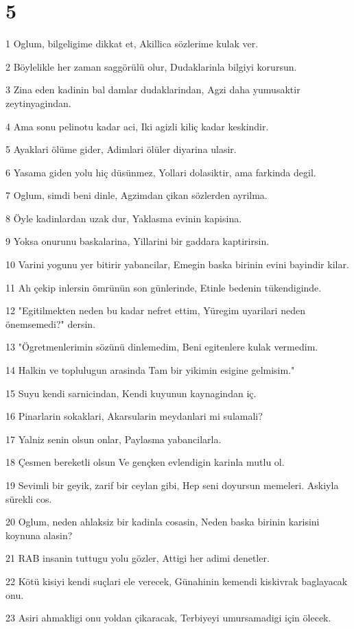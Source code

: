 \chapter{5}

\par 1 Oglum, bilgeligime dikkat et, Akillica sözlerime kulak ver.
\par 2 Böylelikle her zaman saggörülü olur, Dudaklarinla bilgiyi korursun.
\par 3 Zina eden kadinin bal damlar dudaklarindan, Agzi daha yumusaktir zeytinyagindan.
\par 4 Ama sonu pelinotu kadar aci, Iki agizli kiliç kadar keskindir.
\par 5 Ayaklari ölüme gider, Adimlari ölüler diyarina ulasir.
\par 6 Yasama giden yolu hiç düsünmez, Yollari dolasiktir, ama farkinda degil.
\par 7 Oglum, simdi beni dinle, Agzimdan çikan sözlerden ayrilma.
\par 8 Öyle kadinlardan uzak dur, Yaklasma evinin kapisina.
\par 9 Yoksa onurunu baskalarina, Yillarini bir gaddara kaptirirsin.
\par 10 Varini yogunu yer bitirir yabancilar, Emegin baska birinin evini bayindir kilar.
\par 11 Ah çekip inlersin ömrünün son günlerinde, Etinle bedenin tükendiginde.
\par 12 "Egitilmekten neden bu kadar nefret ettim, Yüregim uyarilari neden önemsemedi?" dersin.
\par 13 "Ögretmenlerimin sözünü dinlemedim, Beni egitenlere kulak vermedim.
\par 14 Halkin ve toplulugun arasinda Tam bir yikimin esigine gelmisim."
\par 15 Suyu kendi sarnicindan, Kendi kuyunun kaynagindan iç.
\par 16 Pinarlarin sokaklari, Akarsularin meydanlari mi sulamali?
\par 17 Yalniz senin olsun onlar, Paylasma yabancilarla.
\par 18 Çesmen bereketli olsun Ve gençken evlendigin karinla mutlu ol.
\par 19 Sevimli bir geyik, zarif bir ceylan gibi, Hep seni doyursun memeleri. Askiyla sürekli cos.
\par 20 Oglum, neden ahlaksiz bir kadinla cosasin, Neden baska birinin karisini koynuna alasin?
\par 21 RAB insanin tuttugu yolu gözler, Attigi her adimi denetler.
\par 22 Kötü kisiyi kendi suçlari ele verecek, Günahinin kemendi kiskivrak baglayacak onu.
\par 23 Asiri ahmakligi onu yoldan çikaracak, Terbiyeyi umursamadigi için ölecek.

